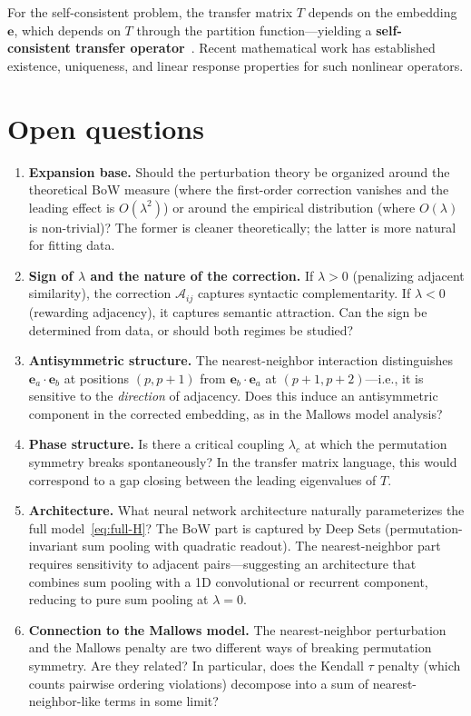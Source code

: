 \documentclass[11pt]{article}
\newcommand{\ee}{\bm{e}}
\begin{document}
For the self-consistent problem, the transfer matrix $T$ depends on the embedding $\ee$, which depends on $T$ through the partition function---yielding a \textbf{self-consistent transfer operator}~\cite{galatolo2023}. Recent mathematical work has established existence, uniqueness, and linear response properties for such nonlinear operators.

\section{Open questions}\label{sec:open}

\begin{enumerate}
    \item \textbf{Expansion base.} Should the perturbation theory be organized around the theoretical BoW measure (where the first-order correction vanishes and the leading effect is $O(\lambda^2)$) or around the empirical distribution (where $O(\lambda)$ is non-trivial)? The former is cleaner theoretically; the latter is more natural for fitting data.

    \item \textbf{Sign of $\lambda$ and the nature of the correction.} If $\lambda > 0$ (penalizing adjacent similarity), the correction $\mathcal{A}_{ij}$ captures syntactic complementarity. If $\lambda < 0$ (rewarding adjacency), it captures semantic attraction. Can the sign be determined from data, or should both regimes be studied?

    \item \textbf{Antisymmetric structure.} The nearest-neighbor interaction distinguishes $\ee_a \cdot \ee_b$ at positions $(p, p{+}1)$ from $\ee_b \cdot \ee_a$ at $(p{+}1, p{+}2)$---i.e., it is sensitive to the \emph{direction} of adjacency. Does this induce an antisymmetric component in the corrected embedding, as in the Mallows model analysis?

    \item \textbf{Phase structure.} Is there a critical coupling $\lambda_c$ at which the permutation symmetry breaks spontaneously? In the transfer matrix language, this would correspond to a gap closing between the leading eigenvalues of $T$.

    \item \textbf{Architecture.} What neural network architecture naturally parameterizes the full model~\eqref{eq:full-H}? The BoW part is captured by Deep Sets (permutation-invariant sum pooling with quadratic readout). The nearest-neighbor part requires sensitivity to adjacent pairs---suggesting an architecture that combines sum pooling with a 1D convolutional or recurrent component, reducing to pure sum pooling at $\lambda = 0$.

    \item \textbf{Connection to the Mallows model.} The nearest-neighbor perturbation and the Mallows penalty are two different ways of breaking permutation symmetry. Are they related? In particular, does the Kendall $\tau$ penalty (which counts pairwise ordering violations) decompose into a sum of nearest-neighbor-like terms in some limit?
\end{enumerate}
\end{document}
